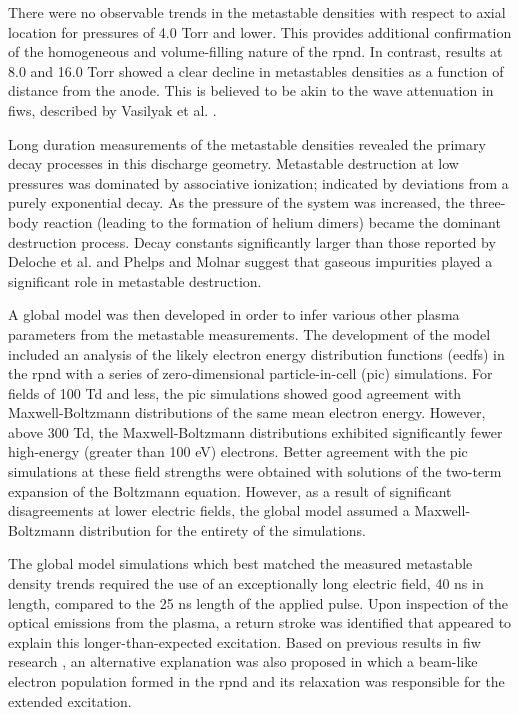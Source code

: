 There were no observable trends in the metastable densities with respect to
axial location for pressures of 4.0 Torr and lower. This provides additional
confirmation of the homogeneous and volume-filling nature of the \acs{rpnd}. In
contrast, results at 8.0 and 16.0 Torr showed a clear decline in metastables
densities as a function of distance from the anode. This is believed to be akin
to the wave attenuation in \acs{fiw}s, described by Vasilyak et al.
\cite{Vasilyak1994}.

Long duration measurements of the metastable densities revealed the primary
decay processes in this discharge geometry. Metastable destruction at low
pressures was dominated by associative ionization; indicated by deviations from
a purely exponential decay. As the pressure of the system was increased, the
three-body reaction (leading to the formation of helium dimers) became the
dominant destruction process. Decay constants significantly larger than
those reported by Deloche et al. \cite{Deloche1976} and Phelps and Molnar
\cite{Phelps1953} suggest that gaseous impurities played a significant role in
metastable destruction.

A global model was then developed in order to infer various other plasma
parameters from the metastable measurements. The development of the model
included an analysis of the likely electron energy distribution functions
(\acs{eedf}s) in the \acs{rpnd} with a series of zero-dimensional
particle-in-cell (\acs{pic}) simulations. For fields of 100 Td and less, the
\acs{pic} simulations showed good agreement with Maxwell-Boltzmann distributions
of the same mean electron energy. However, above 300 Td, the Maxwell-Boltzmann
distributions exhibited significantly fewer high-energy (greater than 100 eV)
electrons. Better agreement with the \acs{pic} simulations at these field
strengths were obtained with solutions of the two-term expansion of the
Boltzmann equation. However, as a result of significant disagreements at lower
electric fields, the global model assumed a Maxwell-Boltzmann distribution for
the entirety of the simulations.

The global model simulations which best matched the measured metastable density
trends required the use of an exceptionally long electric field, 40 ns in
length, compared to the 25 ns length of the applied pulse. Upon inspection of
the optical emissions from the plasma, a return stroke was identified that
appeared to explain this longer-than-expected excitation. Based on previous
results in \acs{fiw} research \cite{Starikovskaia1998}, an alternative
explanation was also proposed in which a beam-like electron population formed in
the \acs{rpnd} and its relaxation was responsible for the extended excitation.

